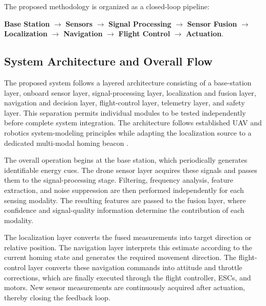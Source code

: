 \documentclass[conference]{IEEEtran}
\begin{document}
The proposed methodology is organized as a closed-loop pipeline:

{\small
\begin{center}
\textbf{Base Station}
$\rightarrow$
\textbf{Sensors}
$\rightarrow$
\textbf{Signal Processing}
$\rightarrow$
\textbf{Sensor Fusion}
$\rightarrow$
\textbf{Localization}
$\rightarrow$
\textbf{Navigation}
$\rightarrow$
\textbf{Flight Control}
$\rightarrow$
\textbf{Actuation}.
\end{center}
}


\subsection{System Architecture and Overall Flow}

The proposed system follows a layered architecture consisting of a base-station
layer, onboard sensor layer, signal-processing layer, localization and fusion
layer, navigation and decision layer, flight-control layer, telemetry layer,
and safety layer. This separation permits individual modules to be tested
independently before complete system integration. The architecture follows
established UAV and robotics system-modeling principles
\cite{corke2017,siciliano2016,spong2006} while adapting the localization source
to a dedicated multi-modal homing beacon
\cite{mahony2012,lee2010,corke2017,px4guide}.

The overall operation begins at the base station, which periodically generates
identifiable energy cues. The drone sensor layer acquires these signals and
passes them to the signal-processing stage. Filtering, frequency analysis,
feature extraction, and noise suppression are then performed independently for
each sensing modality. The resulting features are passed to the fusion layer,
where confidence and signal-quality information determine the contribution of
each modality.

The localization layer converts the fused measurements into target direction
or relative position. The navigation layer interprets this estimate according
to the current homing state and generates the required movement direction. The
flight-control layer converts these navigation commands into attitude and
throttle corrections, which are finally executed through the flight controller,
ESCs, and motors. New sensor measurements are continuously acquired after
actuation, thereby closing the feedback loop.
\end{document}
